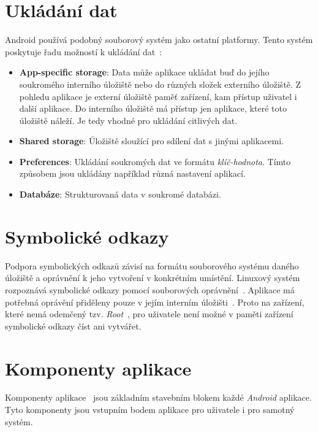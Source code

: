 \section{Ukládání dat}
Android používá podobný souborový systém jako ostatní platformy. Tento systém poskytuje řadu možností k ukládání dat~:
\begin{itemize}
    \item \textbf{App-specific storage}: Data může aplikace ukládat buď do jejího soukromého interního úložiště nebo do různých složek externího úložiště. Z pohledu aplikace je externí úložiště paměť zařízení, kam přístup uživatel i další aplikace. Do interního úložiště má přístup jen aplikace, které toto úložiště náleží. Je tedy vhodné pro ukládání citlivých dat.
    \item \textbf{Shared storage}: Úložiště sloužící pro sdílení dat s jinými aplikacemi.
    \item \textbf{Preferences}\label{preferences}: Ukládání soukromých dat ve formátu \emph{klíč-hodnota}. Tímto způsobem jsou ukládány například různá nastavení aplikací.
    \item \textbf{Databáze}: Strukturovaná data v soukromé databázi.
\end{itemize}

    \section{Symbolické odkazy}
    Podpora symbolických odkazů závisí na formátu souborového systému daného úložiště a oprávnění k jeho vytvoření v konkrétním umístění. Linuxový systém rozpoznává symbolické odkazy pomocí souborových oprávnění~. Aplikace má potřebná oprávění přiděleny pouze v jejím interním úložišti~. Proto na zařízení, které nemá odemčený tzv. \emph{Root}~, pro uživatele není možné v paměti zařízení symbolické odkazy číst ani vytvářet.

\newpage
\section{Komponenty aplikace}
Komponenty aplikace~ jsou základním stavebním blokem každé \emph{Android} aplikace. Tyto komponenty jsou vstupním bodem aplikace pro uživatele i pro samotný systém.

